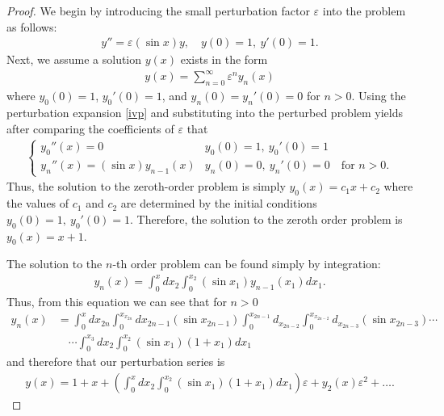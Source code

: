 \documentclass[12pt]{article}
\theoremstyle{definition}
\begin{document}
\begin{proof}
  We begin by introducing the small perturbation factor $\varepsilon$ into the problem as follows:
  \begin{align*}
    y'' = \varepsilon(\sin x) y,\quad y(0) = 1,\ y'(0) = 1.
  \end{align*}
  Next, we assume a solution $y(x)$ exists in the form
  \begin{align}\label{ivp}
    y(x) = \sum_{n=0}^\infty \varepsilon^n y_n(x)
  \end{align}
  where $y_0(0) = 1$, $y_0'(0) = 1$, and $y_n(0) = y_n'(0) = 0$ for $n > 0$. Using
  the perturbation expansion \eqref{ivp} and substituting into the perturbed problem
  yields after comparing the coefficients of $\varepsilon$ that
  \begin{align*}
    \begin{cases}
      y_0''(x) = 0 & y_0(0) = 1,\ y_0'(0) = 1 \\
      y_n''(x) = (\sin x) y_{n-1}(x) & y_n(0) = 0,\ y_n'(0) =0\quad \text{for $n>0$}.
    \end{cases}
  \end{align*}
  Thus, the solution to the zeroth-order problem is simply $y_0(x) = c_1x + c_2$
  where the values of $c_1$ and $c_2$ are determined by the initial conditions
  $y_0(0) = 1,\ y_0'(0) = 1$. Therefore,  the solution
  to the zeroth order problem is $y_0(x) = x + 1$.

  The solution to the $n$-th order problem can be found simply by integration:
  \begin{align*}
    y_n(x) = \int_{0}^{x} dx_2\int_{0}^{x_2} (\sin x_1) y_{n-1}(x_1) dx_1.
  \end{align*}
  Thus, from this equation we can see that for $n > 0$
  \begin{align*}
    y_n(x) &= \int_0^{x}d{x_{2n}}\int_0^{x_{x_{2n}}}d{x_{2n-1}}(\sin x_{2n-1})\int_0^{x_{2n-1}}d_{x_{2n-2}}\int_0^{x_{x_{2n-2}}}d_{x_{2n-3}}(\sin x_{2n-3})\cdots \\
    &\quad \cdots\int_{0}^{x_3} dx_2\int_{0}^{x_2} (\sin x_1) (1 + x_1) dx_1
  \end{align*}
  and therefore that our perturbation series is
  \begin{align*}
    y(x) = 1 + x + \left(\int_{0}^{x} dx_2\int_{0}^{x_2} (\sin x_1) (1+ x_1) dx_1\right)\varepsilon + y_2(x)\varepsilon^2 + \dots .
  \end{align*}


\end{proof}
\end{document}
